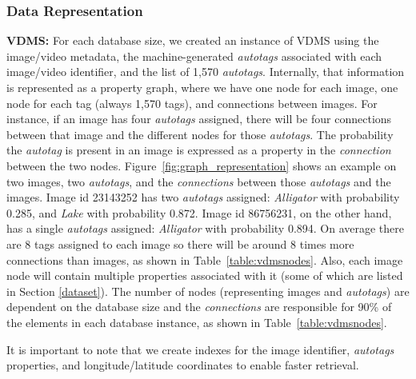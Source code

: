 \subsubsection{Data Representation}

\textbf{VDMS:}
For each database size, we created an instance of VDMS using the image/video metadata,
the machine-generated \textit{autotags} associated with
each image/video identifier, and the list of 1,570 \textit{autotags}.
Internally, that information is represented as a property graph,
where we have one node for each image, one node for each tag
(always 1,570 tags), and connections between images.
For instance, if an image has four \textit{autotags} assigned,
there will be four connections between that image and
the different nodes for those \textit{autotags}.
The probability the \textit{autotag} is present in an image
is expressed as a property in the \textit{connection} between the two nodes.
Figure~\ref{fig:graph_representation} shows an example on two images,
two \textit{autotags}, and the \textit{connections} between
those \textit{autotags} and the images.
Image id 23143252 has two \textit{autotags} assigned:
\textit{Alligator} with probability 0.285, and \textit{Lake} with probability 0.872.
Image id 86756231, on the other hand, has a single \textit{autotags} assigned:
\textit{Alligator} with probability 0.894.
On average there are 8 tags assigned to each image so
there will be around 8 times more connections than images, as shown
in Table~\ref{table:vdmsnodes}.
Also, each image node will contain multiple properties associated
with it (some of which are listed in Section \ref{dataset}). 
The number of nodes (representing images and \textit{autotags}) 
are dependent on the database size and the \textit{connections} are responsible for
90\% of the elements in each database instance,  
as shown in Table~\ref{table:vdmsnodes}.

It is important to note that we create indexes for the image identifier,
\textit{autotags} properties, and longitude/latitude coordinates 
to enable faster retrieval.

